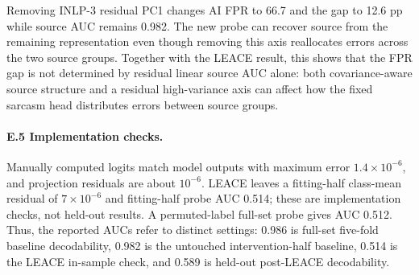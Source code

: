 Removing INLP-3 residual PC1 changes AI FPR to 66.7 and the gap to 12.6 pp while source AUC remains 0.982. The new probe can recover source from the remaining representation even though removing this axis reallocates errors across the two source groups. Together with the LEACE result, this shows that the FPR gap is not determined by residual linear source AUC alone: both covariance-aware source structure and a residual high-variance axis can affect how the fixed sarcasm head distributes errors between source groups.

\paragraph{E.5 Implementation checks.} Manually computed logits match model outputs with maximum error $1.4\times10^{-6}$, and projection residuals are about $10^{-6}$. LEACE leaves a fitting-half class-mean residual of $7\times10^{-6}$ and fitting-half probe AUC 0.514; these are implementation checks, not held-out results. A permuted-label full-set probe gives AUC 0.512. Thus, the reported AUCs refer to distinct settings: 0.986 is full-set five-fold baseline decodability, 0.982 is the untouched intervention-half baseline, 0.514 is the LEACE in-sample check, and 0.589 is held-out post-LEACE decodability.
